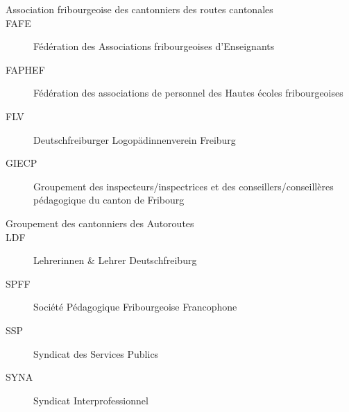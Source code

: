 \begin{description}
\item[Association fribourgeoise des cantonniers des routes cantonales]

\item[FAFE]
	Fédération des Associations fribourgeoises d'Enseignants

\item[FAPHEF]
	Fédération des associations de personnel des Hautes écoles
	fribourgeoises

\item[FLV]
	Deutschfreiburger Logopädinnenverein Freiburg

\item[GIECP]
	Groupement des inspecteurs/inspectrices et des
	conseillers/conseillères pédagogique du canton de Fribourg

\item[Groupement des cantonniers des Autoroutes]

\item[LDF]
	Lehrerinnen \& Lehrer Deutschfreiburg

\item[SPFF]
	Société Pédagogique Fribourgeoise Francophone

\item[SSP]
	Syndicat des Services Publics

\item[SYNA]
	Syndicat Interprofessionnel

\end{description}


